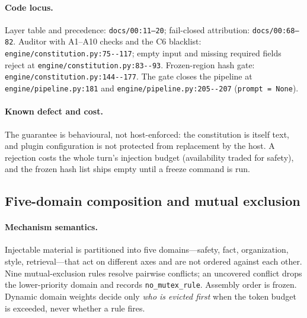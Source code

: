 \paragraph{Code locus.} Layer table and precedence: \texttt{docs/00:11--20};
fail-closed attribution: \texttt{docs/00:68--82}. Auditor with A1--A10 checks and
the C6 blacklist: \texttt{engine/\allowbreak{}constitution.\allowbreak{}py:\allowbreak{}75-\allowbreak{}-\allowbreak{}117}; empty input and missing
required fields reject at \texttt{engine/\allowbreak{}constitution.\allowbreak{}py:\allowbreak{}83-\allowbreak{}-\allowbreak{}93}. Frozen-region
hash gate: \texttt{engine/\allowbreak{}constitution.\allowbreak{}py:\allowbreak{}144-\allowbreak{}-\allowbreak{}177}. The gate closes the pipeline
at \texttt{engine/\allowbreak{}pipeline.\allowbreak{}py:\allowbreak{}181} and \texttt{engine/\allowbreak{}pipeline.\allowbreak{}py:\allowbreak{}205-\allowbreak{}-\allowbreak{}207}
(\texttt{prompt = None}).

\paragraph{Known defect and cost.} The guarantee is behavioural, not
host-enforced: the constitution is itself text, and plugin configuration is not
protected from replacement by the host. A rejection costs the
whole turn's injection budget (availability traded for safety), and the frozen
hash list ships empty until a freeze command is run.

\subsection{Five-domain composition and mutual exclusion}\label{sec:method:compose}

\paragraph{Mechanism semantics.} Injectable material is partitioned into five
domains---safety, fact, organization, style, retrieval---that act on different
axes and are not ordered against each other. Nine mutual-exclusion rules
resolve pairwise conflicts; an uncovered conflict drops the lower-priority
domain and records \texttt{no\_mutex\_rule}. Assembly order is frozen. Dynamic
domain weights decide only \emph{who is evicted first} when the token budget is
exceeded, never whether a rule fires.


